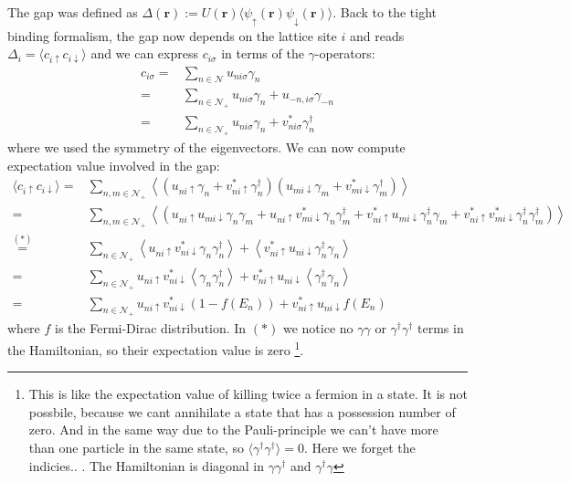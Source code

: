 \documentclass[../main.tex]{subfile}
\begin{document}
The gap was defined as $\Delta(\bm{r}) := U(\bm{r}) \langle \psi_{\uparrow}(\bm{r})\psi_{\downarrow}(\bm{r})\rangle$. Back to the tight binding formalism,
the gap now depends on the lattice site $i$ and reads
$\Delta_i = \langle c_{i\uparrow}c_{i\downarrow}\rangle$ and we can express $c_{i\sigma}$ in terms of the $\gamma$-operators:
\begin{align*}
    c_{i\sigma} =& \sum_{n\in\mathcal{N}} u_{ni\sigma}\gamma_n \\
        =& \sum_{n\in\mathcal{N}_+} u_{ni\sigma}\gamma_n + u_{-n,i\sigma}\gamma_{-n}\\
        =& \sum_{n\in\mathcal{N}_+} u_{ni\sigma}\gamma_n + v_{ni\sigma}^{\ast}\gamma_{n}^{\dagger}
\end{align*}
where we used the symmetry of the eigenvectors. We can now compute expectation value involved in the gap:
\begin{align*}
    \langle c_{i\uparrow}c_{i\downarrow} \rangle =& \sum_{n,m\in\mathcal{N}_+} \left\langle\left(u_{ni\uparrow}\gamma_n + v_{ni\uparrow}^{\ast}\gamma_{n}^{\dagger}\right)\left(u_{mi\downarrow}\gamma_m + v_{mi\downarrow}^{\ast}\gamma_{m}^{\dagger}\right)\right\rangle\\
     =&  \sum_{n,m\in\mathcal{N}_+} \left\langle\left(u_{ni\uparrow} u_{mi\downarrow}\gamma_n\gamma_m + u_{ni\uparrow} v_{mi\downarrow}^{\ast}\gamma_n\gamma_{m}^{\dagger} + v_{ni\uparrow}^{\ast}u_{mi\downarrow}\gamma_{n}^{\dagger} \gamma_m+  v_{ni\uparrow}^{\ast} v_{mi\downarrow}^{\ast}\gamma_{n}^{\dagger}\gamma_{m}^{\dagger}  \right)\right\rangle\\
     \stackrel{(\ast)}{=}&  \sum_{n\in\mathcal{N}_+} \left\langle u_{ni\uparrow} v_{ni\downarrow}^{\ast}\gamma_n\gamma_{n}^{\dagger}\right\rangle + \left\langle v_{ni\uparrow}^{\ast}u_{ni\downarrow}\gamma_{n}^{\dagger}\gamma_{n}\right\rangle\\     
     =&  \sum_{n\in\mathcal{N}_+} u_{ni\uparrow} v_{ni\downarrow}^{\ast}\left\langle\gamma_n\gamma_{n}^{\dagger}\right\rangle + v_{ni\uparrow}^{\ast}u_{ni\downarrow}\left\langle \gamma_{n}^{\dagger}\gamma_{n}\right\rangle\\
     =&  \sum_{n\in\mathcal{N}_+} u_{ni\uparrow} v_{ni\downarrow}^{\ast} \left(1-f(E_n)\right) + v_{ni\uparrow}^{\ast}u_{ni\downarrow}f(E_n)
\end{align*}
where $f$ is the Fermi-Dirac distribution. In $(\ast)$ we notice no $\gamma\gamma$ or $\gamma^{\dagger}\gamma^{\dagger}$ terms in the Hamiltonian, so their expectation 
value is zero
\footnote{This is like the expectation value of killing twice a fermion in a state. It is not possbile, because we cant annihilate a state that has a possession number of zero.
And in the same way due to the Pauli-principle we can't have more than one particle in the same state, so $\langle \gamma^{\dagger} \gamma^{\dagger} \rangle = 0$. Here we 
forget the indicies.. . The Hamiltonian is diagonal in $\gamma\gamma^{\dagger}$ and $\gamma^{\dagger}\gamma$ }.
\end{document}
